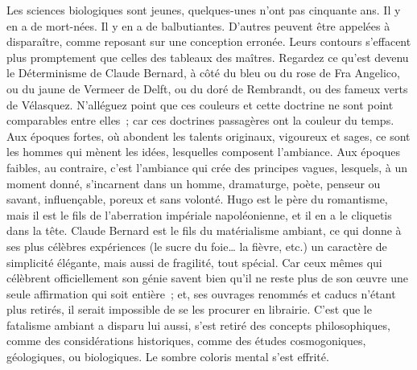\documentclass[french,twoside]{book} %
\begin{document}
Les sciences biologiques sont jeunes, quelques-unes n’ont pas cinquante ans. Il y en a de mort-nées. Il y en a de balbutiantes. D’autres peuvent être appelées à disparaître, comme reposant sur une conception erronée. Leurs contours s’effacent plus promptement que celles des tableaux des maîtres. Regardez ce qu’est devenu le Déterminisme de Claude Bernard, à côté du bleu ou du rose de Fra Angelico, ou du jaune de Vermeer de Delft, ou du doré de Rembrandt, ou des fameux verts de Vélasquez. N’alléguez point que ces couleurs et cette doctrine ne sont point comparables entre elles ; car ces doctrines passagères ont la couleur du temps. Aux époques fortes, où abondent les talents originaux, vigoureux et sages, ce sont les hommes qui mènent les idées, lesquelles composent l’ambiance. Aux époques faibles, au contraire, c’est l’ambiance qui crée des principes vagues, lesquels, à un moment donné, s’incarnent dans un homme, dramaturge, poète, penseur ou savant, influençable, poreux et sans volonté. Hugo est le père du romantisme, mais il est le fils de l’aberration impériale napoléonienne, et il en a le cliquetis dans la tête. Claude Bernard est le fils du matérialisme ambiant, ce qui donne à ses plus célèbres expériences (le sucre du foie… la fièvre, etc.) un caractère de simplicité élégante, mais aussi de fragilité, tout spécial. Car ceux mêmes qui célèbrent officiellement son génie savent bien qu’il ne reste plus de son œuvre une seule affirmation qui soit entière ; et, ses ouvrages renommés et caducs n’étant plus retirés, il serait impossible de se les procurer en librairie. C’est que le fatalisme ambiant a disparu lui aussi, s’est retiré des concepts philosophiques, comme des considérations historiques, comme des études cosmogoniques, géologiques, ou biologiques. Le sombre coloris mental s’est effrité.\par
\end{document}

